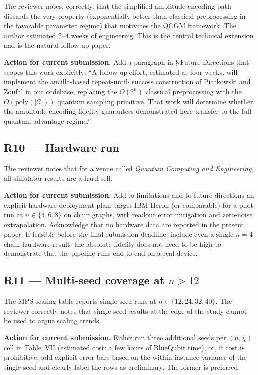 \documentclass[conference,10pt]{IEEEtran}
\begin{document}
The reviewer notes, correctly, that the simplified amplitude-encoding
path discards the very property (exponentially-better-than-classical
preprocessing in the favorable parameter regime) that motivates the
QCGM framework. The author estimated $2$--$4$ weeks of engineering. This
is the central technical extension and is the natural follow-up paper.

\textbf{Action for current submission.} Add a paragraph in \S\,Future
Directions that scopes this work explicitly: ``A follow-up effort,
estimated at four weeks, will implement the ancilla-based repeat-until-
success construction of Piatkowski and Zoufal in our codebase, replacing
the $O(2^n)$ classical preprocessing with the $O(\mathrm{poly}(|\mathcal{C}|))$
quantum sampling primitive. That work will determine whether the
amplitude-encoding fidelity guarantees demonstrated here transfer to the
full quantum-advantage regime.''

\subsection{R10 --- Hardware run}

The reviewer notes that for a venue called \emph{Quantum Computing and
Engineering}, all-simulator results are a hard sell.

\textbf{Action for current submission.} Add to limitations and to
future directions an explicit hardware-deployment plan: target IBM
Heron (or comparable) for a pilot run at $n \in \{4, 6, 8\}$ on chain
graphs, with readout error mitigation and zero-noise extrapolation.
Acknowledge that no hardware data are reported in the present paper.
If feasible before the final submission deadline, include even a single
$n=4$ chain hardware result; the absolute fidelity does not need to be
high to demonstrate that the pipeline runs end-to-end on a real device.

\subsection{R11 --- Multi-seed coverage at $n > 12$}

The MPS scaling table reports single-seed runs at $n \in \{12, 24, 32, 40\}$.
The reviewer correctly notes that single-seed results at the edge of the
study cannot be used to argue scaling trends.

\textbf{Action for current submission.} Either run three additional seeds
per $(n, \chi)$ cell in Table~VII (estimated cost: a few hours of
BlueQubit time), or, if cost is prohibitive, add explicit error bars
based on the within-instance variance of the single seed and clearly
label the rows as preliminary. The former is preferred.
\end{document}
